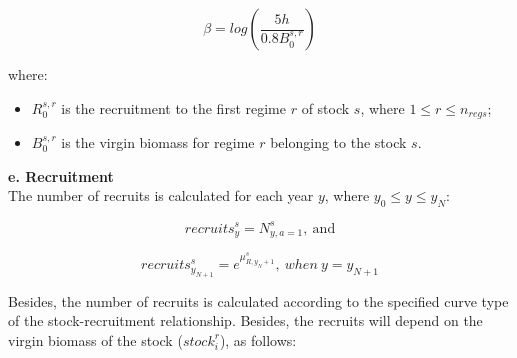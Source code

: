 \documentclass{article}
\begin{document}
\begin{equation}
\beta = log\left(\dfrac{5h}{0.8B^{s,r}_0}\right)
\end{equation}

where:

\begin{itemize}

\item $R^{s,r}_0$ is the recruitment to the first regime $r$ of stock $s$, where $1\leq r \leq n_{regs}$;

\item $B^{s,r}_0$ is the virgin biomass for regime $r$ belonging to the stock $s$.


\end{itemize}

\hfill

\textbf{e. Recruitment}\\


The number of recruits is calculated for each year $y$, where $y_0\leq y \leq y_N$:

\begin{equation}
    recruits^s_y =N^s_{y,a = 1}, \ \text{and}
\end{equation}


\begin{equation}
    recruits^s_{y_{N+1}}=e^{\mu^s_{R,y_N+1}}, \ when \ y = y_{N+1}
\end{equation}

Besides, the number of recruits is calculated according to the specified curve type of the stock-recruitment relationship. Besides, the recruits will depend on the virgin biomass of the stock ($stock_i^r$), as follows:
\end{document}
